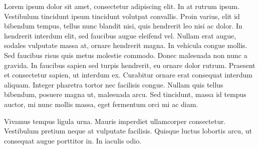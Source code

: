 Lorem ipsum dolor sit amet, consectetur adipiscing elit. In at rutrum ipsum. Vestibulum tincidunt ipsum tincidunt volutpat convallis. Proin varius, elit id bibendum tempus, tellus nunc blandit nisi, quis hendrerit leo nisi ac dolor. In hendrerit interdum elit, sed faucibus augue eleifend vel. Nullam erat augue, sodales vulputate massa at, ornare hendrerit magna. In vehicula congue mollis. Sed faucibus risus quis metus molestie commodo. Donec malesuada non nunc a gravida. In faucibus sapien sed turpis hendrerit, eu ornare dolor rutrum. Praesent et consectetur sapien, ut interdum ex. Curabitur ornare erat consequat interdum aliquam. Integer pharetra tortor nec facilisis congue. Nullam quis tellus bibendum, posuere magna ut, malesuada arcu. Sed tincidunt, massa id tempus auctor, mi nunc mollis massa, eget fermentum orci mi ac diam.

Vivamus tempus ligula urna. Mauris imperdiet ullamcorper consectetur. Vestibulum pretium neque at vulputate facilisis. Quisque luctus lobortis arcu, ut consequat augue porttitor in. In iaculis odio. 